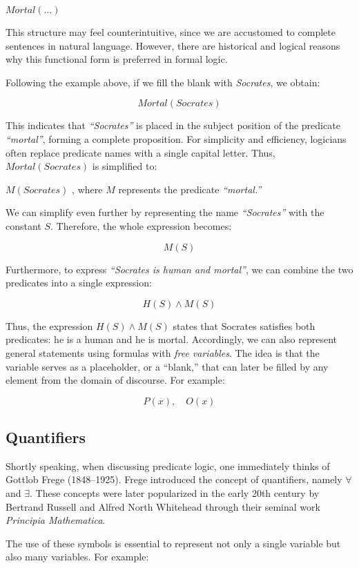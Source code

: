 \documentclass[12pt,a4paper,openany]{article}
\begin{document}
\(Mortal(\dots)\)

This structure may feel counterintuitive, since we are accustomed to
complete sentences in natural language. However, there are historical
and logical reasons why this functional form is preferred in formal
logic.

Following the example above, if we fill the blank with \emph{Socrates},
we obtain:

\[Mortal(Socrates)\]

This indicates that \emph{``Socrates''} is placed in the subject
position of the predicate \emph{``mortal''}, forming a complete
proposition. For simplicity and efficiency, logicians often replace
predicate names with a single capital letter. Thus, \(Mortal(Socrates)\)
is simplified to:

\(M(Socrates)\) , where \(M\) represents the predicate
\emph{``mortal.''}

We can simplify even further by representing the name
\emph{``Socrates''} with the constant \(S\). Therefore, the whole
expression becomes:

\[M(S)\]

Furthermore, to express \emph{``Socrates is human and mortal''}, we can
combine the two predicates into a single expression:

\[ H(S) \land M(S) \]

Thus, the expression \(H(S) \land M(S)\) states that Socrates satisfies
both predicates: he is a human and he is mortal. Accordingly, we can
also represent general statements using formulas with \emph{free
variables}. The idea is that the variable serves as a placeholder, or a
``blank,'' that can later be filled by any element from the domain of
discourse. For example:

\[ P(x), \quad O(x)\]

\subsection{Quantifiers}\label{quantifiers}

Shortly speaking, when discussing predicate logic, one immediately
thinks of Gottlob Frege (1848--1925). Frege introduced the concept of
quantifiers, namely \(\forall\) and \(\exists\). These concepts were
later popularized in the early 20th century by Bertrand Russell and
Alfred North Whitehead through their seminal work \emph{Principia
Mathematica}.

The use of these symbols is essential to represent not only a single
variable but also many variables. For example:
\end{document}
